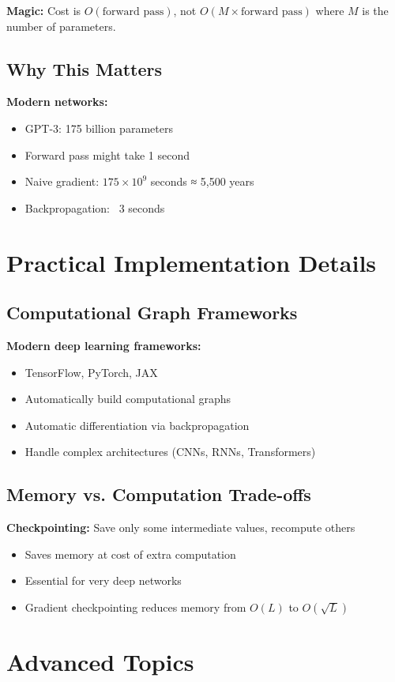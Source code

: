 \documentclass[11pt]{article}
\begin{document}
\textbf{Magic:} Cost is $O(\text{forward pass})$, not $O(M \times \text{forward pass})$ where $M$ is the number of parameters.

\subsection{Why This Matters}
\textbf{Modern networks:}
\begin{itemize}
\item GPT-3: 175 billion parameters
\item Forward pass might take 1 second
\item Naive gradient: $175 \times 10^9$ seconds ≈ 5,500 years
\item Backpropagation: ~3 seconds
\end{itemize}

\section{Practical Implementation Details}

\subsection{Computational Graph Frameworks}
\textbf{Modern deep learning frameworks:}
\begin{itemize}
\item TensorFlow, PyTorch, JAX
\item Automatically build computational graphs
\item Automatic differentiation via backpropagation
\item Handle complex architectures (CNNs, RNNs, Transformers)
\end{itemize}

\subsection{Memory vs. Computation Trade-offs}
\textbf{Checkpointing:} Save only some intermediate values, recompute others
\begin{itemize}
\item Saves memory at cost of extra computation
\item Essential for very deep networks
\item Gradient checkpointing reduces memory from $O(L)$ to $O(\sqrt{L})$
\end{itemize}

\section{Advanced Topics}
\end{document}
